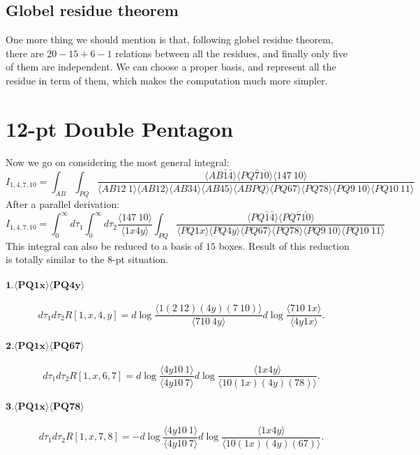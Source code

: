 \documentclass[10pt]{article}
\def\<{\langle}
\def\>{\rangle}
\begin{document}
\subsection{Globel residue theorem}
One more thing we should mention is that, following globel residue theorem, there are $20-15+6-1$ relations between all the residues, and finally only five of them are independent. We can choose a proper basis, and represent all the residue in term of them, which makes the computation much more simpler.







\section{12-pt Double Pentagon}
Now we go on considering the most general integral:
\begin{equation}
I_{1,4,7,10}=\int_{AB}\int_{PQ}\frac{\<AB\bar1\bar4\>\<PQ\bar7\overline{10}\>\<147\ 10\>}{\<AB12\ 1\>\<AB12\>\<AB34\>\<AB45\>\<ABPQ\>\<PQ67\>\<PQ78\>\<PQ9\ 10\>\<PQ10\
 11\>}
\end{equation}
After a parallel derivation:
\begin{equation}
I_{1,4,7,10}=\int_0^{\infty}d\tau_1\int_0^{\infty}d\tau_2\frac{\<147\ 10\>}{\<1x4y\>}\int_{PQ}\frac{\< PQ\bar1\bar4\> \<PQ\bar7\bar{10}\>}{\<PQ1x\>\<PQ4y\>\<PQ67\>\<PQ78\>\<PQ9\ 10\>\<PQ10\
 11\>}
\end{equation}
This integral can also be reduced to a basis of $15$ boxes. Result of this reduction is totally similar to the $8$-pt situation.

\paragraph{$\mathbf{1.\<PQ1x\>\<PQ4y\>}$}

\[
    d\tau_1 d\tau_2 R[1,x,4,y]
    =d\log \frac{\<1(2\ 12)(4y)(7\ 10)\>}{\<710\ 4y\>}d\log \frac{\<710\ 1x\>}{\<4y1x\>}.
\]
\paragraph{$\mathbf{2.\<PQ1x\>\<PQ67\>}$}
\[
    d\tau_1 d\tau_2 R[1,x,6,7]
    =d\log \frac{\<4y10\ 1\>}{\<4y10\ 7\>}d\log \frac{\<1x4y\>}{\<10(1x)(4y)(78)\>}.
\]
\paragraph{$\mathbf{3.\<PQ1x\>\<PQ78\>}$}
\[
    d\tau_1 d\tau_2 R[1,x,7,8]
    =-d\log \frac{\<4y10\ 1\>}{\<4y10\ 7\>}d\log \frac{\<1x4y\>}{\<10(1x)(4y)(67)\>}.
\]
\end{document}
